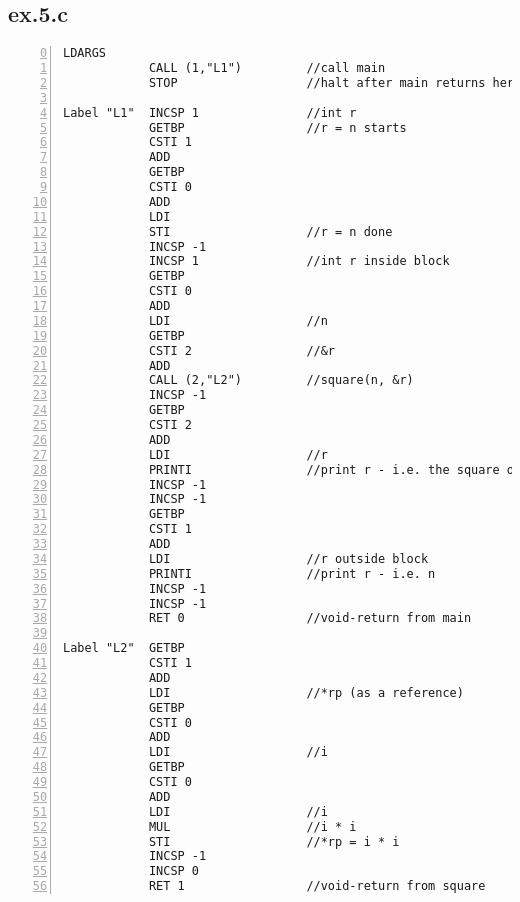 \documentclass[a4paper, titlepage]{article}
\begin{document}
\subsection*{ex.5.c}
\begin{lstlisting}[numbers=left, firstnumber=0]
            LDARGS
            CALL (1,"L1")         //call main
            STOP                  //halt after main returns here

Label "L1"  INCSP 1               //int r
            GETBP                 //r = n starts
            CSTI 1
            ADD
            GETBP
            CSTI 0
            ADD
            LDI
            STI                   //r = n done
            INCSP -1
            INCSP 1               //int r inside block
            GETBP
            CSTI 0
            ADD
            LDI                   //n
            GETBP
            CSTI 2                //&r
            ADD
            CALL (2,"L2")         //square(n, &r)
            INCSP -1
            GETBP
            CSTI 2
            ADD
            LDI                   //r
            PRINTI                //print r - i.e. the square of n
            INCSP -1
            INCSP -1
            GETBP
            CSTI 1
            ADD
            LDI                   //r outside block
            PRINTI                //print r - i.e. n
            INCSP -1
            INCSP -1
            RET 0                 //void-return from main

Label "L2"  GETBP
            CSTI 1
            ADD
            LDI                   //*rp (as a reference)
            GETBP
            CSTI 0
            ADD
            LDI                   //i
            GETBP
            CSTI 0
            ADD
            LDI                   //i
            MUL                   //i * i
            STI                   //*rp = i * i
            INCSP -1
            INCSP 0
            RET 1                 //void-return from square
\end{lstlisting}
\end{document}
